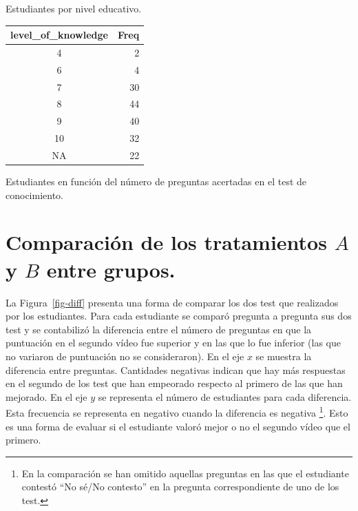 \documentclass[
  12pt,
  a4paper,
  extrafontsizes,
  onecolumn,
  openright]{memoir}
\begin{document}
\begin{table}
\begin{minipage}[t]{0.50\linewidth}
{Estudiantes por nivel educativo.

}

\end{minipage}%
%
\begin{minipage}[t]{0.50\linewidth}

{\centering 

\hypertarget{tbl-contingencia-eco-4}{}
\begin{longtable}{cr}
\tabularnewline

\toprule
level\_of\_knowledge & Freq \\ 
\midrule
4 & 2 \\ 
6 & 4 \\ 
7 & 30 \\ 
8 & 44 \\ 
9 & 40 \\ 
10 & 32 \\ 
NA & 22 \\ 
\bottomrule
\end{longtable}

Estudiantes en función del número de preguntas acertadas en el test de
conocimiento.

}

\end{minipage}%

\end{table}

\hypertarget{sec-eda-3}{%
\section{\texorpdfstring{Comparación de los tratamientos \(A\) y \(B\)
entre
grupos.}{Comparación de los tratamientos A y B entre grupos.}}\label{sec-eda-3}}

La Figura~\ref{fig-diff} presenta una forma de comparar los dos test que
realizados por los estudiantes. Para cada estudiante se comparó pregunta
a pregunta sus dos test y se contabilizó la diferencia entre el número
de preguntas en que la puntuación en el segundo vídeo fue superior y en
las que lo fue inferior (las que no variaron de puntuación no se
consideraron). En el eje \(x\) se muestra la diferencia entre preguntas.
Cantidades negativas indican que hay más respuestas en el segundo de los
test que han empeorado respecto al primero de las que han mejorado. En
el eje \(y\) se representa el número de estudiantes para cada
diferencia. Esta frecuencia se representa en negativo cuando la
diferencia es negativa \footnote{En la comparación se han omitido
  aquellas preguntas en las que el estudiante contestó \enquote{No sé/No
  contesto} en la pregunta correspondiente de uno de los test.}. Esto es
una forma de evaluar si el estudiante valoró mejor o no el segundo vídeo
que el primero.
\end{document}
